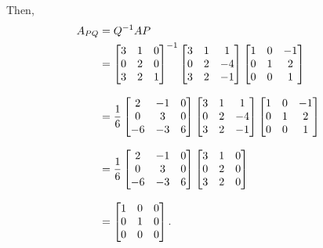 \documentclass[MathsNotesBase.tex]{subfiles}
\begin{document}
{\begin{exe}
{			Then,
			\begin{align*}
			A_{PQ} &= {Q}^{-1} A P \\
			&= 	{\begin{bmatrix}
					3 & 1 & 0\\
					0 & 2 & 0\\
					3 & 2 & 1
				\end{bmatrix}}^{-1}
				\begin{bmatrix}
					3 & 1 & 1  \\
					0 & 2 & -4 \\
					3 & 2 & -1
				\end{bmatrix}
				\begin{bmatrix}
					1 & 0 & -1  \\
					0 & 1 &  2 \\
					0 & 0 &  1
				\end{bmatrix} &\text{\scriptsize{}} \\[8pt]
			&= 	\frac{1}{6}
				\begin{bmatrix}
					2  & -1 & 0\\
					0  &  3 & 0\\
					-6 & -3 & 6
				\end{bmatrix}
				\begin{bmatrix}
					3 & 1 & 1  \\
					0 & 2 & -4 \\
					3 & 2 & -1
				\end{bmatrix}
				\begin{bmatrix}
					1 & 0 & -1  \\
					0 & 1 &  2 \\
					0 & 0 &  1
				\end{bmatrix} &\text{\scriptsize{}} \\[8pt]
			&= 	\frac{1}{6}
				\begin{bmatrix}
				2  & -1 & 0\\
				0  &  3 & 0\\
				-6 & -3 & 6
				\end{bmatrix}
				\begin{bmatrix}
				3 & 1 & 0 \\
				0 & 2 & 0 \\
				3 & 2 & 0
				\end{bmatrix} &\text{\scriptsize{}} \\[8pt]
			&= 	\begin{bmatrix}
					1 & 0 & 0\\
					0 & 1 & 0\\
					0 & 0 & 0
				\end{bmatrix}.
			\end{align*}
			}\label{ex:matrix-simplification-by-selecting-bases}
		\end{exe}
		
	}
\end{document}
